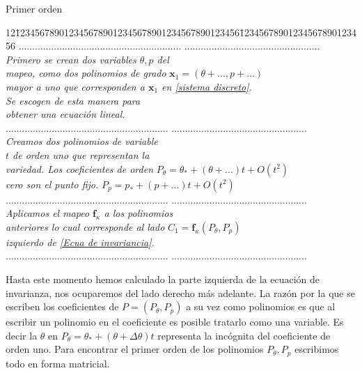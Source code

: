 \begin{center}
Primer orden
\begin{tabbing}
12\=1234567890123456789012345678901234567890123456\=12345678901234567890123456\kill%
\>............................................................  \>..................................................\\
\>\textsl{Primero se crean dos variables $\theta,p$ del} \> \\
\>\textsl{mapeo, como dos polinomios de grado} \>$\mathbf{x}_{1}=(\theta+... ,p+...)$  \\
\>\textsl{mayor a uno que corresponden a $\mathbf{x}_{1}$ en \ref{sistema discreto}.}\>   \\
\>\textsl{Se escogen de esta manera para }\>   \\
\>\textsl{obtener una ecuación lineal. }\>   \\
\>............................................................  \>..................................................\\
\>\textsl{Creamos dos polinomios de variable}\> \\
\>\textsl{$t$ de orden uno que representan la }  \> \\
\>\textsl{variedad. Los coeficientes de orden }\> $P_{\theta}=\theta_{*}+(\theta+...)t+O(t^{2})$\\
\>\textsl{cero son el punto fijo.} \> $ P_{p}=p_{*}+(p+...)t+O(t^{2})$\\
\>............................................................  \>..................................................\\
\>\textsl{Aplicamos el mapeo $\mathbf{f}_{\kappa}$ a los polinomios  }\> \\
\>\textsl{anteriores lo cual corresponde al lado } \>$C_{1}=\mathbf{f}_{\kappa}(P_{\theta},P_{p})$  \\
\>\textsl{izquierdo de \ref{Ecua de invariancia}.} \> \\
\>............................................................  \>..................................................\\
\end{tabbing} 


\end{center}
Hasta este momento hemos calculado la parte izquierda de la ecuación de invarianza, nos ocuparemos del lado derecho más adelante. La razón por la que se escriben los coeficientes de $P=(P_{\theta},P_{p})$ a su vez como polinomios es que al escribir un polinomio en el coeficiente es posible tratarlo como una variable. Es decir la $\theta$ en $P_{\theta}=\theta_{*}+(\theta+\Delta \theta)t$ representa la incógnita del coeficiente de orden uno. Para encontrar el primer orden de los polinomios $P_{\theta},P_{p}$ escribimos todo en forma matricial.
